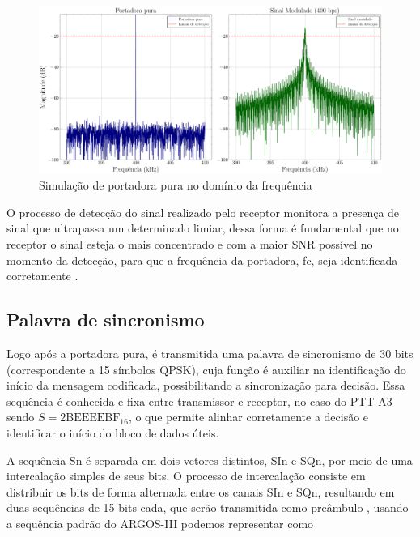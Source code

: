 \begin{figure}[ht]
	\centering
	\caption{Simulação de portadora pura no domínio da frequência}\label{fig:portadora_pura_freq}
	\includegraphics[width=\linewidth]{assets/plots/carrier_spectra.pdf}
    
\end{figure}

O processo de detecção do sinal realizado pelo receptor monitora a presença de sinal que ultrapassa um determinado limiar, dessa forma é fundamental que no receptor o sinal esteja o mais concentrado e com a maior \gls{SNR} possível no momento da detecção, para que a frequência da portadora, \gls{fc}, seja identificada corretamente \cite{cnes_services_and_message_formats_ed2_rev2_2006}.


\subsection{Palavra de sincronismo}

Logo após a portadora pura, é transmitida uma palavra de sincronismo de 30 bits (correspondente a 15 símbolos \gls{QPSK}), cuja função é auxiliar na identificação do início da mensagem codificada, possibilitando a sincronização para decisão. Essa sequência é conhecida e fixa entre transmissor e receptor, no caso do \gls{PTT-A3} sendo $S = \text{2BEEEEBF}_{16}$, o que permite alinhar corretamente a decisão e identificar o início do bloco de dados úteis. \cite{cnes_services_and_message_formats_ed2_rev2_2006}

A sequência \gls{Sn} é separada em dois vetores distintos, \gls{SIn} e \gls{SQn}, por meio de uma intercalação simples de seus bits. O processo de intercalação consiste em distribuir os bits de forma alternada entre os canais \gls{SIn} e \gls{SQn}, resultando em duas sequências de 15 bits cada, que serão transmitida como preâmbulo \cite{cnes_services_and_message_formats_ed2_rev2_2006}, usando a sequência padrão do \gls{ARGOS-III} podemos representar como

